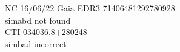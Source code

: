 NC 16/06/22
Gaia EDR3 71406481292780928\\
simabd not found\\

CTI 034036.8+280248\\
simbad incorrect\\